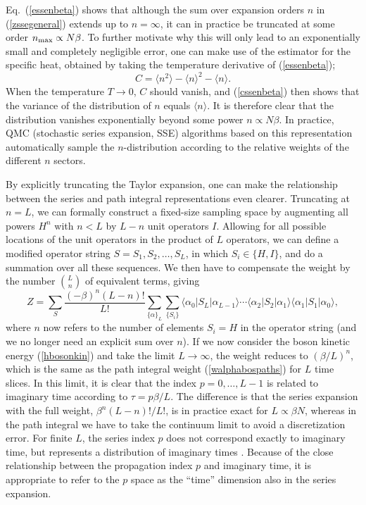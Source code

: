 \documentclass[draft,numberedheadings]{aipproc}
\begin{document}
Eq.~(\ref{essenbeta}) shows that although the sum over expansion orders $n$ in (\ref{zssegeneral}) extends up to $n=\infty$, it can in practice be truncated 
at some order $n_{\rm max} \propto N\beta$. To further motivate why this will only lead to an exponentially small and completely negligible error, one can make 
use of the estimator for the specific heat, obtained by taking the temperature derivative of (\ref{essenbeta});
\begin{equation}
C = \langle n^2\rangle - \langle n\rangle^2 - \langle n\rangle.
\label{cssenbeta}
\end{equation}
When the temperature $T\to 0$, $C$ should vanish, and (\ref{cssenbeta}) then shows that the variance of the distribution of $n$ equals $\langle n\rangle$. 
It is therefore clear that the distribution vanishes exponentially beyond some power $n \propto N\beta$. In practice, QMC (stochastic series expansion, 
SSE) algorithms based on this representation automatically sample the $n$-distribution according to the relative weights of the different $n$ sectors. 

By explicitly truncating the Taylor expansion, one can make the relationship between the series and path integral representations even clearer. Truncating 
at $n=L$, we can formally construct a fixed-size sampling space by augmenting all powers $H^n$ with $n<L$ by $L-n$ unit operators $I$. Allowing for all possible 
locations of the unit operators in the product of $L$ operators, we can define a modified operator string $S=S_1,S_2,\ldots, S_L$, in which $S_i \in \{H,I\}$, 
and do a summation over all these sequences. We then have to compensate the weight by the number $L\choose{n}$ of equivalent terms, giving
\begin{equation}
Z = \sum_{S} \frac{(-\beta)^n(L-n)!}{L!}
\sum_{\{\alpha\}_L} \sum_{\{S_i\}}
 \langle \alpha_0|S_L|\alpha_{L-1}\rangle \cdots \langle \alpha_2 |S_2|\alpha_1\rangle\langle \alpha_1 |S_1|\alpha_0\rangle, 
\label{zssegenera2}
\end{equation}
where $n$ now refers to the number of elements $S_i=H$ in the operator string (and we no longer need an explicit sum over $n$).
If we now consider the boson kinetic energy (\ref{hbosonkin}) and take the limit $L \to \infty$, the weight reduces to $(\beta/L)^n$, which is the same 
as the path integral weight (\ref{walphabospaths}) for $L$ time slices. In this limit, it is clear that the index $p=0,\ldots,L-1$ is related to
imaginary time according to $\tau=p\beta/L$. The difference is that the series expansion with the full weight, $\beta^n(L-n)!/L!$, is in practice exact 
for $L \propto \beta N$, whereas in the path integral we have to take the continuum limit to avoid a discretization error. For finite $L$, the series
index $p$ does not correspond exactly to imaginary time, but represents a distribution of imaginary times \cite{sandvik92}. Because of the close relationship 
between the propagation index $p$ and imaginary time, it is appropriate to refer to the $p$ space as the ``time'' dimension also in the series expansion.
\end{document}
